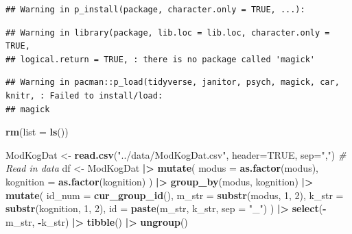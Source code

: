 \documentclass[
  doc,floatsintext]{apa6}
\newenvironment{Shaded}{\begin{snugshade}}{\end{snugshade}}
\newcommand{\AttributeTok}[1]{\textcolor[rgb]{0.13,0.29,0.53}{#1}}
\newcommand{\CommentTok}[1]{\textcolor[rgb]{0.56,0.35,0.01}{\textit{#1}}}
\newcommand{\ConstantTok}[1]{\textcolor[rgb]{0.56,0.35,0.01}{#1}}
\newcommand{\DecValTok}[1]{\textcolor[rgb]{0.00,0.00,0.81}{#1}}
\newcommand{\FunctionTok}[1]{\textcolor[rgb]{0.13,0.29,0.53}{\textbf{#1}}}
\newcommand{\NormalTok}[1]{#1}
\newcommand{\OtherTok}[1]{\textcolor[rgb]{0.56,0.35,0.01}{#1}}
\newcommand{\SpecialCharTok}[1]{\textcolor[rgb]{0.81,0.36,0.00}{\textbf{#1}}}
\newcommand{\StringTok}[1]{\textcolor[rgb]{0.31,0.60,0.02}{#1}}
\begin{document}
\begin{verbatim}
## Warning in p_install(package, character.only = TRUE, ...):
\end{verbatim}

\begin{verbatim}
## Warning in library(package, lib.loc = lib.loc, character.only = TRUE,
## logical.return = TRUE, : there is no package called 'magick'
\end{verbatim}

\begin{verbatim}
## Warning in pacman::p_load(tidyverse, janitor, psych, magick, car, knitr, : Failed to install/load:
## magick
\end{verbatim}

\begin{Shaded}
\begin{Highlighting}[]
\FunctionTok{rm}\NormalTok{(}\AttributeTok{list =} \FunctionTok{ls}\NormalTok{())}

\NormalTok{ModKogDat }\OtherTok{\textless{}{-}} \FunctionTok{read.csv}\NormalTok{(}\StringTok{"../data/ModKogDat.csv"}\NormalTok{, }\AttributeTok{header=}\ConstantTok{TRUE}\NormalTok{, }\AttributeTok{sep=}\StringTok{","}\NormalTok{) }
\CommentTok{\# Read in data}
\NormalTok{df }\OtherTok{\textless{}{-}}\NormalTok{ ModKogDat }\SpecialCharTok{|\textgreater{}} 
  \FunctionTok{mutate}\NormalTok{(}
    \AttributeTok{modus =} \FunctionTok{as.factor}\NormalTok{(modus),}
    \AttributeTok{kognition =} \FunctionTok{as.factor}\NormalTok{(kognition)}
\NormalTok{    ) }\SpecialCharTok{|\textgreater{}} 
  \FunctionTok{group\_by}\NormalTok{(modus, kognition) }\SpecialCharTok{|\textgreater{}} 
  \FunctionTok{mutate}\NormalTok{(}
    \AttributeTok{id\_num =} \FunctionTok{cur\_group\_id}\NormalTok{(),}
    \AttributeTok{m\_str =} \FunctionTok{substr}\NormalTok{(modus, }\DecValTok{1}\NormalTok{, }\DecValTok{2}\NormalTok{),}
    \AttributeTok{k\_str =} \FunctionTok{substr}\NormalTok{(kognition, }\DecValTok{1}\NormalTok{, }\DecValTok{2}\NormalTok{),}
    \AttributeTok{id =} \FunctionTok{paste}\NormalTok{(m\_str, k\_str, }\AttributeTok{sep =} \StringTok{"\_"}\NormalTok{)}
\NormalTok{  ) }\SpecialCharTok{|\textgreater{}} 
  \FunctionTok{select}\NormalTok{(}\SpecialCharTok{{-}}\NormalTok{m\_str, }\SpecialCharTok{{-}}\NormalTok{k\_str) }\SpecialCharTok{|\textgreater{}} 
  \FunctionTok{tibble}\NormalTok{() }\SpecialCharTok{|\textgreater{}} 
  \FunctionTok{ungroup}\NormalTok{() }
\end{Highlighting}
\end{Shaded}
\end{document}
